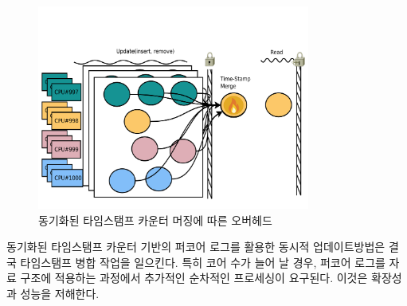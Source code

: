 \begin{figure}[h]
    \centering
    \includegraphics[width=0.8\textwidth]{fig/oplog_max}
    \caption{동기화된 타임스탬프 카운터 머징에 따른 오버헤드}
  \label{fig:oplog_log}
\end{figure}


동기화된 타임스탬프 카운터 기반의 퍼코어 로그를 활용한 동시적 업데이트방법은 결국
 타임스탬프 병합 작업을 일으킨다.
특히 코어 수가 늘어 날 경우, 퍼코어 로그를 자료 구조에 적용하는 과정에서 추가적인 
순차적인 프로세싱이 요구된다.
이것은 확장성과 성능을 저해한다. 




